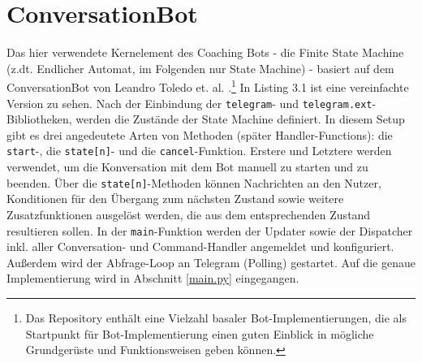     \section{ConversationBot} \label{Grundlagen: ConversationBot}
        Das hier verwendete Kernelement des Coaching Bots - die Finite State Machine (z.dt. Endlicher Automat, im Folgenden nur \glqq State Machine\grqq) - basiert auf dem ConversationBot von Leandro Toledo et. al. \cite{conversationBot}.\footnote{Das Repository enthält eine Vielzahl basaler Bot-Implementierungen, die als Startpunkt für Bot-Implementierung einen guten Einblick in mögliche Grundgerüste und Funktionsweisen geben können.} In Listing 3.1 ist eine vereinfachte Version zu sehen. Nach der Einbindung der \verb|telegram|- und \verb|telegram.ext|-Bibliotheken, werden die Zustände der State Machine definiert. In diesem Setup gibt es drei angedeutete Arten von Methoden (später Handler-Functions): die \verb|start|-, die \verb|state[n]|- und die \verb|cancel|-Funktion. Erstere und Letztere werden verwendet, um die Konversation mit dem Bot manuell zu starten und zu beenden. Über die \verb|state[n]|-Methoden können Nachrichten an den Nutzer, Konditionen für den Übergang zum nächsten Zustand sowie weitere Zusatzfunktionen ausgelöst werden, die aus dem entsprechenden Zustand resultieren sollen. 
        In der \verb|main|-Funktion werden der Updater sowie der Dispatcher inkl. aller Conversation- und Command-Handler angemeldet und konfiguriert. Außerdem wird der Abfrage-Loop an Telegram (Polling) gestartet. Auf die genaue Implementierung wird in Abschnitt \ref{main.py} eingegangen.
        
